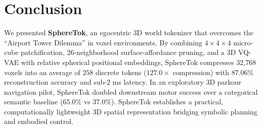 \documentclass[10pt,twocolumn,letterpaper]{article}
\begin{document}
\section{Conclusion}

We presented \textbf{SphereTok}, an egocentric 3D world tokenizer that overcomes the ``Airport Tower Dilemma'' in voxel environments. By combining $4 \times 4 \times 4$ micro-cube patchification, 26-neighborhood surface-affordance pruning, and a 3D VQ-VAE with relative spherical positional embeddings, SphereTok compresses 32,768 voxels into an average of 258 discrete tokens ($127.0\times$ compression) with 87.06\% reconstruction accuracy and sub-2 ms latency. In an exploratory 3D parkour navigation pilot, SphereTok doubled downstream motor success over a categorical semantic baseline ($65.0\%$ vs $37.0\%$). SphereTok establishes a practical, computationally lightweight 3D spatial representation bridging symbolic planning and embodied control.
\end{document}
